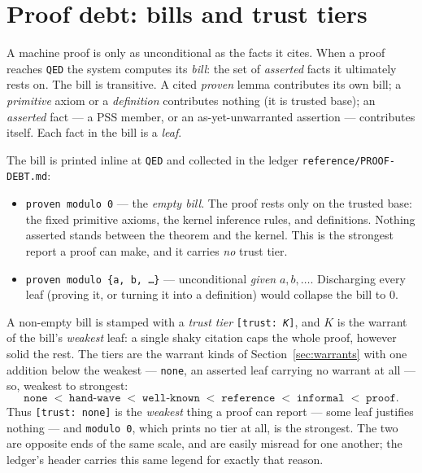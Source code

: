 \section{Proof debt: bills and trust tiers}
\label{sec:proof-debt}

A machine proof is only as unconditional as the facts it cites.  When a
proof reaches \texttt{QED} the system computes its \emph{bill}: the set of
\emph{asserted} facts it ultimately rests on.  The bill is transitive.  A
cited \emph{proven} lemma contributes its own bill; a \emph{primitive}
axiom or a \emph{definition} contributes nothing (it is trusted base); an
\emph{asserted} fact --- a PSS member, or an as-yet-unwarranted assertion
--- contributes itself.  Each fact in the bill is a \emph{leaf}.

The bill is printed inline at \texttt{QED} and collected in the ledger
\texttt{reference/PROOF-DEBT.md}:

\begin{itemize}
\item \texttt{proven modulo 0} --- the \emph{empty bill}.  The proof rests
  only on the trusted base: the fixed primitive axioms, the kernel
  inference rules, and definitions.  Nothing asserted stands between the
  theorem and the kernel.  This is the strongest report a proof can make,
  and it carries \emph{no} trust tier.
\item \texttt{proven modulo \{a, b, \ldots\}} --- unconditional
  \emph{given} $a, b, \ldots$.  Discharging every leaf (proving it, or
  turning it into a definition) would collapse the bill to $0$.
\end{itemize}

\noindent
A non-empty bill is stamped with a \emph{trust tier}
\texttt{[trust:\ \textit{K}]}, and $K$ is the warrant of the bill's
\emph{weakest} leaf: a single shaky citation caps the whole proof, however
solid the rest.  The tiers are the warrant kinds of
Section~\ref{sec:warrants} with one addition below the weakest ---
\texttt{none}, an asserted leaf carrying no warrant at all --- so, weakest
to strongest:
\[
  \texttt{none} \;<\; \texttt{hand-wave} \;<\; \texttt{well-known}
  \;<\; \texttt{reference} \;<\; \texttt{informal} \;<\; \texttt{proof}.
\]
Thus \texttt{[trust:\ none]} is the \emph{weakest} thing a proof can
report --- some leaf justifies nothing --- and \texttt{modulo 0}, which
prints no tier at all, is the strongest.  The two are opposite ends of the
same scale, and are easily misread for one another; the ledger's header
carries this same legend for exactly that reason.

